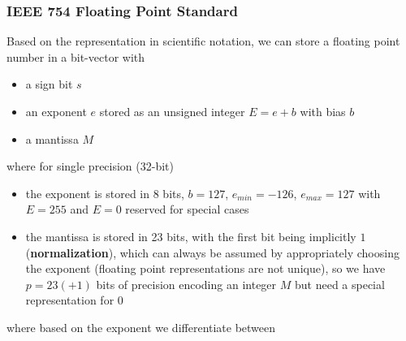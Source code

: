 \subsubsection{IEEE 754 Floating Point Standard}
Based on the representation in scientific notation, we can store a floating point number in a bit-vector with
\begin{itemize}
    \item a sign bit $s$
    \item an exponent $e$ stored as an unsigned integer $E = e + b$ with bias $b$
    \item a mantissa $M$
\end{itemize}
where for single precision (32-bit)
\begin{itemize}
    \item the exponent is stored in 8 bits, $b = 127$, $e_{min} = -126$, $e_{max} = 127$ with $E = 255$ and $E = 0$ reserved for special cases
    \item the mantissa is stored in 23 bits, with the first bit being implicitly $1$ (\textbf{normalization}), which can always be assumed by appropriately choosing the exponent (floating point representations are not unique), so we have $p = 23(+1)$ bits of precision encoding an integer $M$ but need a special representation for $0$
\end{itemize}
where based on the exponent we differentiate between
